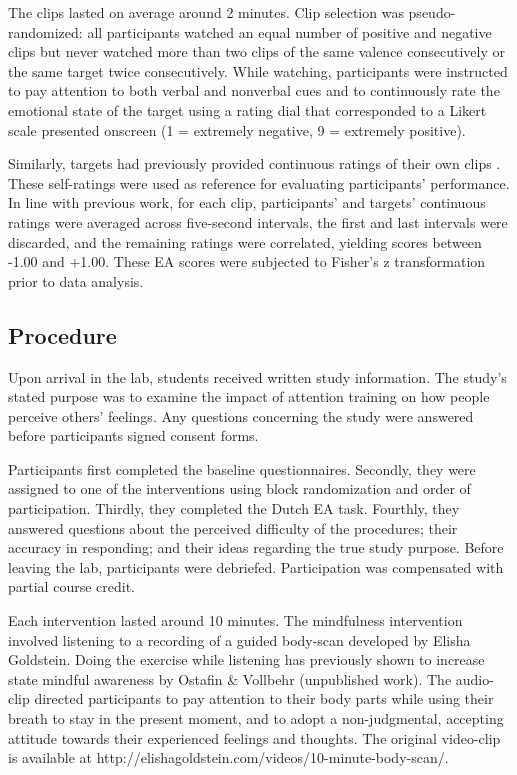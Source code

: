 \documentclass[authordate, empirical]{jote-new-article}
\begin{document}
	The clips lasted on average around 2 minutes. Clip selection was pseudo-randomized: all participants watched an equal number of positive and negative clips but never watched more than two clips of the same valence consecutively or the same target twice consecutively. While watching, participants were instructed to pay attention to both verbal and nonverbal cues and to continuously rate the emotional state of the target using a rating dial that corresponded to a Likert scale presented onscreen (1 = extremely negative, 9 = extremely positive).



	Similarly, targets had previously provided continuous ratings of their own clips \parencites{aanhetRot2014}. These self-ratings were used as reference for evaluating participants' performance. In line with previous work, for each clip, participants' and targets' continuous ratings were averaged across five-second intervals, the first and last intervals were discarded, and the remaining ratings were correlated, yielding scores between -1.00 and +1.00. These EA scores were subjected to Fisher's z transformation prior to data analysis.



	\subsection{Procedure}



	Upon arrival in the lab, students received written study information. The study's stated purpose was to examine the impact of attention training on how people perceive others' feelings. Any questions concerning the study were answered before participants signed consent forms.



	Participants first completed the baseline questionnaires. Secondly, they were assigned to one of the interventions using block randomization and order of participation. Thirdly, they completed the Dutch EA task. Fourthly, they answered questions about the perceived difficulty of the procedures; their accuracy in responding; and their ideas regarding the true study purpose. Before leaving the lab, participants were debriefed. Participation was compensated with partial course credit.



	Each intervention lasted around 10 minutes.\textbf{ }The mindfulness intervention involved listening\textbf{ }to a recording of a guided body-scan developed by Elisha Goldstein. Doing the exercise while listening has previously shown to increase state mindful awareness by Ostafin \& Vollbehr (unpublished work). The audio-clip directed participants to pay attention to their body parts while using their breath to stay in the present moment, and to adopt a non-judgmental, accepting attitude towards their experienced feelings and thoughts. The original video-clip is available at http://elishagoldstein.com/videos/10-minute-body-scan/.
\end{document}
